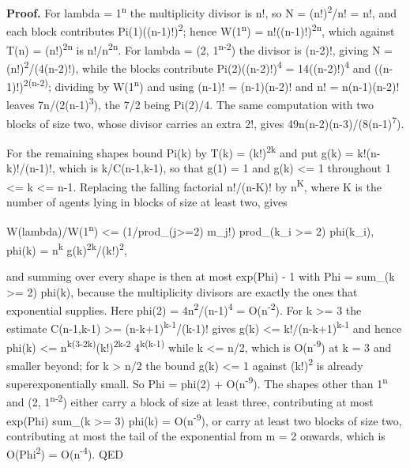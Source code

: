 \documentclass[
  11pt,
]{article}
\begin{document}
\textbf{Proof.} For lambda = 1\textsuperscript{n} the multiplicity
divisor is n!, so N = (n!)\textsuperscript{2}/n! = n!, and each block
contributes Pi(1)((n-1)!)\textsuperscript{2}; hence
W(1\textsuperscript{n}) = n!((n-1)!)\textsuperscript{2n}, which against
T(n) = (n!)\textsuperscript{2n} is n!/n\textsuperscript{2n}. For lambda
= (2, 1\textsuperscript{n-2}) the divisor is (n-2)!, giving N =
(n!)\textsuperscript{2}/(4(n-2)!), while the blocks contribute
Pi(2)((n-2)!)\textsuperscript{4} = 14((n-2)!)\textsuperscript{4} and
((n-1)!)\textsuperscript{2(n-2)}; dividing by W(1\textsuperscript{n})
and using (n-1)! = (n-1)(n-2)! and n! = n(n-1)(n-2)! leaves
7n/(2(n-1)\textsuperscript{3}), the 7/2 being Pi(2)/4. The same
computation with two blocks of size two, whose divisor carries an extra
2!, gives 49n(n-2)(n-3)/(8(n-1)\textsuperscript{7}).

For the remaining shapes bound Pi(k) by T(k) = (k!)\textsuperscript{2k}
and put g(k) = k!(n-k)!/(n-1)!, which is k/C(n-1,k-1), so that g(1) = 1
and g(k) \textless= 1 throughout 1 \textless= k \textless= n-1.
Replacing the falling factorial n!/(n-K)! by n\textsuperscript{K}, where
K is the number of agents lying in blocks of size at least two, gives

W(lambda)/W(1\textsuperscript{n}) \textless= (1/prod\_(j\textgreater=2)
m\_j!) prod\_(k\_i \textgreater= 2) phi(k\_i), phi(k) =
n\textsuperscript{k} g(k)\textsuperscript{2k}/(k!)\textsuperscript{2},

and summing over every shape is then at most exp(Phi) - 1 with Phi =
sum\_(k \textgreater= 2) phi(k), because the multiplicity divisors are
exactly the ones that exponential supplies. Here phi(2) =
4n\textsuperscript{2}/(n-1)\textsuperscript{4} =
O(n\textsuperscript{-2}). For k \textgreater= 3 the estimate C(n-1,k-1)
\textgreater= (n-k+1)\textsuperscript{k-1}/(k-1)! gives g(k) \textless=
k!/(n-k+1)\textsuperscript{k-1} and hence phi(k) \textless=
n\textsuperscript{k(3-2k)}(k!)\textsuperscript{2k-2}
4\textsuperscript{k(k-1)} while k \textless= n/2, which is
O(n\textsuperscript{-9}) at k = 3 and smaller beyond; for k
\textgreater{} n/2 the bound g(k) \textless= 1 against
(k!)\textsuperscript{2} is already superexponentially small. So Phi =
phi(2) + O(n\textsuperscript{-9}). The shapes other than
1\textsuperscript{n} and (2, 1\textsuperscript{n-2}) either carry a
block of size at least three, contributing at most exp(Phi) sum\_(k
\textgreater= 3) phi(k) = O(n\textsuperscript{-9}), or carry at least
two blocks of size two, contributing at most the tail of the exponential
from m = 2 onwards, which is O(Phi\textsuperscript{2}) =
O(n\textsuperscript{-4}). QED
\end{document}
